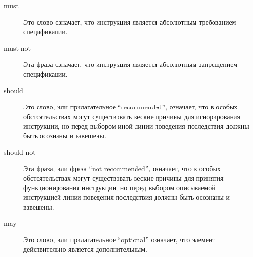\begin{description}
\item[must] Это слово означает, что инструкция является абсолютным требованием
  спецификации.
\item[must not] Эта фраза означает, что инструкция является абсолютным запрещением
  спецификации.
\item[should] Это слово, или прилагательное ``recommended'', означает, что
  в особых обстоятельствах могут существовать веские причины для игнорирования инструкции, но перед
  выбором иной линии поведения последствия должны быть осознаны и взвешены.
\item[should not] Эта фраза, или фраза ``not recommended'', означает, что
  в особых обстоятельствах могут существовать веские причины для принятия функционирования
  инструкции, но перед выбором описываемой инструкцией линии поведения последствия
  должны быть осознаны и взвешены.
\item[may] Это слово, или прилагательное ``optional'' означает, что
  элемент действительно является дополнительным.
\end{description}\vspace{1mm}

